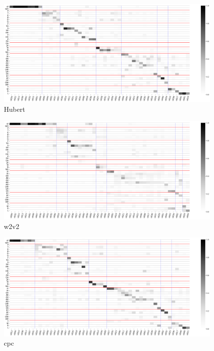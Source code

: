 {

\begin{figure}
    \centering
    \includegraphics[width=1\linewidth]{figures/hubert50.png}
    \caption{Hubert}
    \label{fig:enter-label}
\end{figure}
\begin{figure}
    \centering
    \includegraphics[width=1\linewidth]{figures/w2v250.png}
    \caption{w2v2}
    \label{fig:enter-label}
\end{figure}

\begin{figure}
    \centering
    \includegraphics[width=1\linewidth]{figures/cpc50.png}
    \caption{cpc}
    \label{fig:enter-label}
\end{figure}

}
